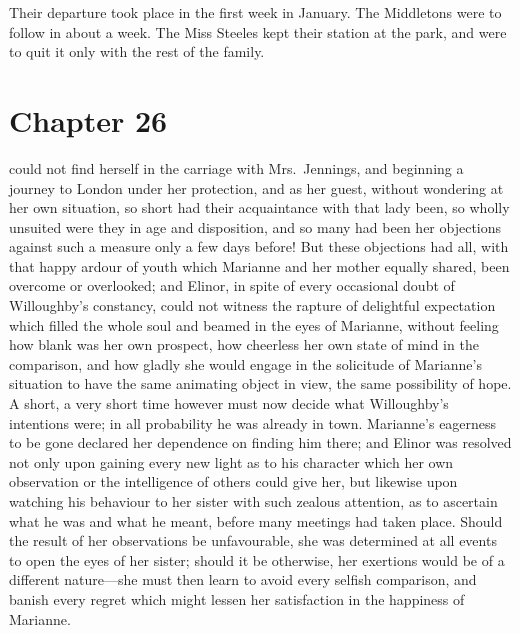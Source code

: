 Their departure took place in the first week in January.
The Middletons were to follow in about a week.  The Miss
Steeles kept their station at the park, and were to quit
it only with the rest of the family.



\chapter{Chapter 26}


 could not find herself in the carriage with Mrs.\ Jennings,
and beginning a journey to London under her protection,
and as her guest, without wondering at her own situation,
so short had their acquaintance with that lady been,
so wholly unsuited were they in age and disposition,
and so many had been her objections against such a measure
only a few days before! But these objections had all,
with that happy ardour of youth which Marianne and her mother
equally shared, been overcome or overlooked; and Elinor,
in spite of every occasional doubt of Willoughby's constancy,
could not witness the rapture of delightful expectation
which filled the whole soul and beamed in the eyes
of Marianne, without feeling how blank was her own prospect,
how cheerless her own state of mind in the comparison,
and how gladly she would engage in the solicitude of
Marianne's situation to have the same animating object
in view, the same possibility of hope.  A short, a very
short time however must now decide what Willoughby's
intentions were; in all probability he was already in town.
Marianne's eagerness to be gone declared her dependence
on finding him there; and Elinor was resolved not only upon
gaining every new light as to his character which her
own observation or the intelligence of others could give her,
but likewise upon watching his behaviour to her sister
with such zealous attention, as to ascertain what he was
and what he meant, before many meetings had taken place.
Should the result of her observations be unfavourable,
she was determined at all events to open the eyes
of her sister; should it be otherwise, her exertions
would be of a different nature---she must then learn
to avoid every selfish comparison, and banish every regret
which might lessen her satisfaction in the happiness of Marianne.

